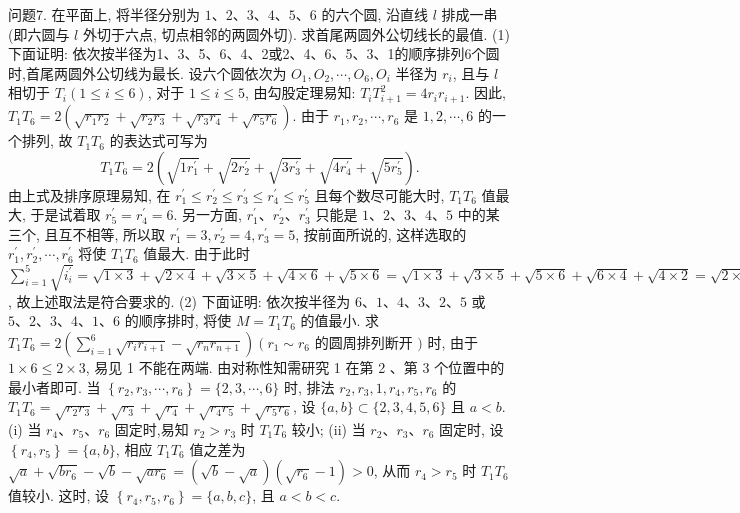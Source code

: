 问题7. 在平面上, 将半径分别为 $1 、 2 、 3 、 4 、 5 、 6$ 的六个圆, 沿直线 $l$ 排成一串 (即六圆与 $l$ 外切于六点, 切点相邻的两圆外切). 求首尾两圆外公切线长的最值.
(1)下面证明: 依次按半径为1、3、5、6、4、2或2、4、6、5、3、1的顺序排列6个圆时,首尾两圆外公切线为最长.
设六个圆依次为 $O_1, O_2, \cdots, O_6, O_i$ 半径为 $r_i$, 且与 $l$ 相切于 $T_i(1 \leqslant i \leqslant 6)$, 对于 $1 \leqslant i \leqslant 5$, 由勾股定理易知: $T_i T_{i+1}^2=4 r_i r_{i+1}$.
因此, $T_1 T_6=2\left(\sqrt{r_1 r_2}+\sqrt{r_2 r_3}+\sqrt{r_3 r_4}+\sqrt{r_5 r_6}\right)$.
由于 $r_1, r_2, \cdots, r_6$ 是 $1,2, \cdots, 6$ 的一个排列, 故 $T_1 T_6$ 的表达式可写为
$$
T_1 T_6=2\left(\sqrt{1 r_1^{\prime}}+\sqrt{2 r_2^{\prime}}+\sqrt{3 r_3^{\prime}}+\sqrt{4 r_4^{\prime}}+\sqrt{5 r_5^{\prime}}\right) .
$$
由上式及排序原理易知, 在 $r_1^{\prime} \leqslant r_2^{\prime} \leqslant r_3^{\prime} \leqslant r_4^{\prime} \leqslant r_5^{\prime}$ 且每个数尽可能大时, $T_1 T_6$ 值最大, 于是试着取 $r_5^{\prime}=r_4^{\prime}=6$.
另一方面, $r_1^{\prime} 、 r_2^{\prime} 、 r_3^{\prime}$ 只能是 $1 、 2 、 3 、 4 、 5$ 中的某三个, 且互不相等, 所以取 $r_1^{\prime}=3, r_2^{\prime}=4, r_3^{\prime}=5$, 按前面所说的, 这样选取的 $r_1^{\prime}, r_2^{\prime}, \cdots, r_6^{\prime}$ 将使 $T_1 T_6$ 值最大.
由于此时 $\sum_{i=1}^5 \sqrt{i_i^{\prime}}=\sqrt{1 \times 3}+\sqrt{2 \times 4}+\sqrt{3 \times 5}+\sqrt{4 \times 6}+\sqrt{5 \times 6}= \sqrt{1 \times 3}+\sqrt{3 \times 5}+\sqrt{5 \times 6}+\sqrt{6 \times 4}+\sqrt{4 \times 2}=\sqrt{2 \times 4}+\sqrt{4 \times 6}+ \sqrt{6 \times 5}+\sqrt{5 \times 3}+\sqrt{3 \times} \overline{1}$, 故上述取法是符合要求的.
(2) 下面证明: 依次按半径为 $6 、 1 、 4 、 3 、 2 、 5$ 或 $5 、 2 、 3 、 4 、 1 、 6$ 的顺序排时, 将使 $M=T_1 T_6$ 的值最小.
求 $T_1 T_6=2\left(\sum_{i=1}^6 \sqrt{r_i r_{i+1}}-\sqrt{r_n r_{n+1}}\right)\left(r_1 \sim r_6\right.$ 的圆周排列断开 $)$ 时, 由于 $1 \times 6 \leqslant 2 \times 3$, 易见 1 不能在两端.
由对称性知需研究 1 在第 2 、第 3 个位置中的最小者即可.
当 $\left\{r_2, r_3, \cdots, r_6\right\}=\{2,3, \cdots, 6\}$ 时, 排法 $r_2, r_3, 1, r_4, r_5, r_6$ 的 $T_1 T_6=\sqrt{r_2 r_3}+\sqrt{r_3}+\sqrt{r_4}+\sqrt{r_4 r_5}+\sqrt{r_5 r_6}$, 设 $\{a, b\} \subset\{2,3,4,5,6\}$ 且 $a<b$.
(i) 当 $r_4 、 r_5 、 r_6$ 固定时,易知 $r_2>r_3$ 时 $T_1 T_6$ 较小;
(ii) 当 $r_2 、 r_3 、 r_6$ 固定时, 设 $\left\{r_4, r_5\right\}=\{a, b\}$, 相应 $T_1 T_6$ 值之差为 $\sqrt{a}+\sqrt{b r_6}-\sqrt{b}-\sqrt{a r_6}=(\sqrt{b}-\sqrt{a})\left(\sqrt{r_6}-1\right)>0$, 从而 $r_4>r_5$ 时 $T_1 T_6$ 值较小.
这时, 设 $\left\{r_4, r_5, r_6\right\}=\{a, b, c\}$, 且 $a<b<c$.
